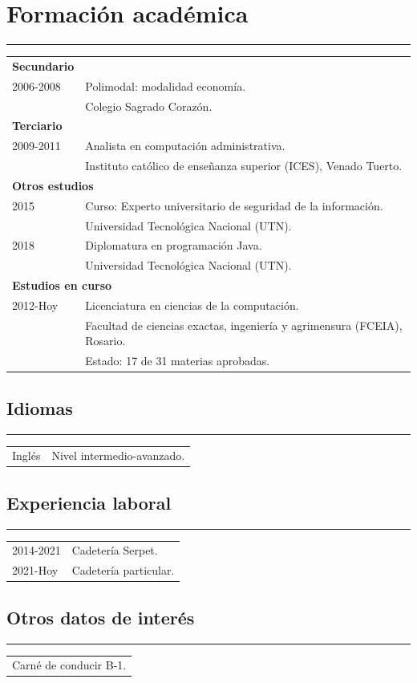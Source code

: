 \documentclass[12pt]{article}
\begin{document}
\section*{Formación académica}
\hrule
\begin{tabular}{l l}
  \multicolumn{1}{l}{\textbf{Secundario}}\\
  2006-2008&Polimodal: modalidad economía.\\
           &\small{Colegio Sagrado Corazón.}\\
  \multicolumn{2}{l}{\textbf{Terciario}}\\
  2009-2011&Analista en computación administrativa.\\
           &\small{Instituto católico de enseñanza superior (ICES), Venado Tuerto.}\\
  \multicolumn{2}{l}{\textbf{Otros estudios}}\\
  2015&Curso: Experto universitario de seguridad de la información.\\
           &\small{Universidad Tecnológica Nacional (UTN).}\\
  2018&Diplomatura en programación Java.\\
           &\small{Universidad Tecnológica Nacional (UTN).}\\
  \multicolumn{2}{l}{\textbf{Estudios en curso}}\\
  2012-Hoy&Licenciatura en ciencias de la computación.\\
           &\small{Facultad de ciencias exactas, ingeniería y agrimensura (FCEIA), Rosario.}\\
           &\small{Estado: 17 de 31 materias aprobadas.}\\
\end{tabular}
\subsection*{Idiomas}
\hrule
\begin{tabular}{l l}
  Inglés&Nivel intermedio-avanzado.\\
\end{tabular}
\subsection*{Experiencia laboral}
\hrule
\begin{tabular}{l l}
  2014-2021&Cadetería Serpet.\\
  2021-Hoy&Cadetería particular.
\end{tabular}
\subsection*{Otros datos de interés}
\hrule
\begin{tabular}{l}
  Carné de conducir B-1.\\
\end{tabular}
\end{document}
